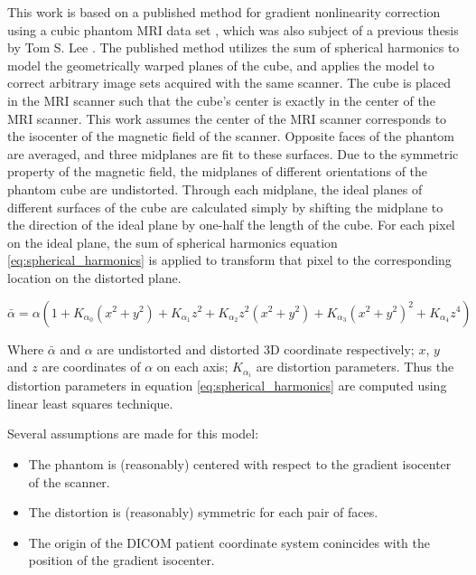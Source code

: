 This work is based on a published method for gradient nonlinearity correction using a cubic phantom MRI data set \cite{simple_approach}, which was also subject of a previous thesis by Tom S. Lee \cite{tom_thesis}.
The published method utilizes the sum of spherical
harmonics to model the geometrically warped planes of the cube, and applies the model
to correct arbitrary image sets acquired with the same scanner. The cube is
placed in the MRI scanner such that the cube's center is exactly in the center of the MRI scanner.  This work assumes the center of the MRI scanner corresponds to the isocenter of the
magnetic field of the scanner. Opposite faces of the phantom are averaged, and three midplanes are fit to these surfaces.  Due to the symmetric property of the magnetic field,
the midplanes of different orientations of the phantom cube are undistorted.  Through each midplane, the ideal planes of different surfaces
of the cube are calculated simply by shifting the midplane to the direction
of the ideal plane by one-half the length of the cube. For each pixel on
the ideal plane, the sum of spherical
harmonics equation \ref{eq:spherical_harmonics} is applied to transform that pixel to the corresponding location on the distorted plane.

\begin{equation} \label{eq:spherical_harmonics}
\bar{\alpha} = \alpha(1 + K_{\alpha_0}(x^2 + y^2) + K_{\alpha_1}z^2 +
K_{\alpha_2}z^2(x^2 + y^2) + K_{\alpha_3}(x^2 + y^2)^2 +
K_{\alpha_4}z^4)
\end{equation}

Where $\bar{\alpha}$ and $\alpha$ are undistorted and distorted 3D coordinate respectively; $x$, $y$ and $z$ are coordinates of $\alpha$ on each axis; $K_{\alpha_i}$ are distortion parameters. Thus the distortion parameters in
equation \ref{eq:spherical_harmonics} are computed using linear least squares
technique.

Several assumptions are made for this model:
\begin{itemize}
  \item The phantom is (reasonably) centered with respect to the gradient isocenter of the scanner.
  \item The distortion is (reasonably) symmetric for each pair of faces.
  \item The origin of the DICOM patient coordinate system conincides with the position of the gradient
    isocenter.
\end{itemize}


